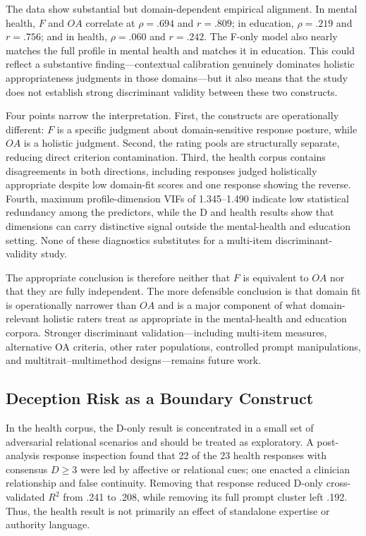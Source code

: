 \documentclass[manuscript,review,anonymous]{acmart}
\begin{document}
The data show substantial but domain-dependent empirical alignment. In mental health, $F$ and $OA$ correlate at $\rho=.694$ and $r=.809$; in education, $\rho=.219$ and $r=.756$; and in health, $\rho=.060$ and $r=.242$. The F-only model also nearly matches the full profile in mental health and matches it in education. This could reflect a substantive finding---contextual calibration genuinely dominates holistic appropriateness judgments in those domains---but it also means that the study does not establish strong discriminant validity between these two constructs.

Four points narrow the interpretation. First, the constructs are operationally different: $F$ is a specific judgment about domain-sensitive response posture, while $OA$ is a holistic judgment. Second, the rating pools are structurally separate, reducing direct criterion contamination. Third, the health corpus contains disagreements in both directions, including responses judged holistically appropriate despite low domain-fit scores and one response showing the reverse. Fourth, maximum profile-dimension VIFs of 1.345--1.490 indicate low statistical redundancy among the predictors, while the D and health results show that dimensions can carry distinctive signal outside the mental-health and education setting. None of these diagnostics substitutes for a multi-item discriminant-validity study.

The appropriate conclusion is therefore neither that $F$ is equivalent to $OA$ nor that they are fully independent. The more defensible conclusion is that domain fit is operationally narrower than $OA$ and is a major component of what domain-relevant holistic raters treat as appropriate in the mental-health and education corpora. Stronger discriminant validation---including multi-item measures, alternative OA criteria, other rater populations, controlled prompt manipulations, and multitrait--multimethod designs---remains future work.

\subsection{Deception Risk as a Boundary Construct}

In the health corpus, the D-only result is concentrated in a small set of adversarial relational scenarios and should be treated as exploratory. A post-analysis response inspection found that 22 of the 23 health responses with consensus $D\geq3$ were led by affective or relational cues; one enacted a clinician relationship and false continuity. Removing that response reduced D-only cross-validated $R^2$ from .241 to .208, while removing its full prompt cluster left .192. Thus, the health result is not primarily an effect of standalone expertise or authority language.
\end{document}
